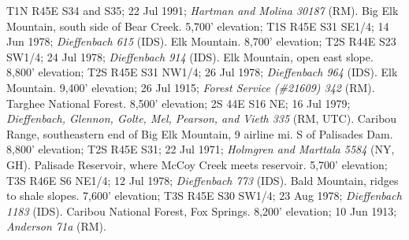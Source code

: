 T1N R45E S34 and S35; 22 Jul 1991; \textit{Hartman and Molina 30187} (RM).
Big Elk Mountain, south side of Bear Creek. 5,700' elevation;
T1S R45E S31 SE1/4; 14 Jun 1978; \textit{Dieffenbach 615} (IDS).
Elk Mountain. 8,700' elevation; T2S R44E S23 SW1/4; 24 Jul 1978;
\textit{Dieffenbach 914} (IDS).
Elk Mountain, open east slope. 8,800' elevation; T2S R45E S31 NW1/4;
26 Jul 1978; \textit{Dieffenbach 964} (IDS).
Elk Mountain. 9,400' elevation; 26 Jul 1915;
\textit{Forest Service (\#21609) 342} (RM).
Targhee National Forest. 8,500' elevation; 2S 44E S16 NE; 16 Jul 1979;
\textit{Dieffenbach, Glennon, Golte, Mel, Pearson, and Vieth 335} (RM, UTC).
Caribou Range, southeastern end of Big Elk Mountain, 9 airline mi. S of
Palisades Dam. 8,800' elevation; T2S R45E S31; 22 Jul 1971;
\textit{Holmgren and Marttala 5584} (NY, GH).
Palisade Reservoir, where McCoy Creek meets reservoir. 5,700' elevation;
T3S R46E S6 NE1/4; 12 Jul 1978; \textit{Dieffenbach 773} (IDS).
Bald Mountain, ridges to shale slopes. 7,600' elevation; T3S R45E S30 SW1/4;
23 Aug 1978; \textit{Dieffenbach 1183} (IDS).
Caribou National Forest, Fox Springs. 8,200' elevation; 10 Jun 1913;
\textit{Anderson 71a} (RM).


